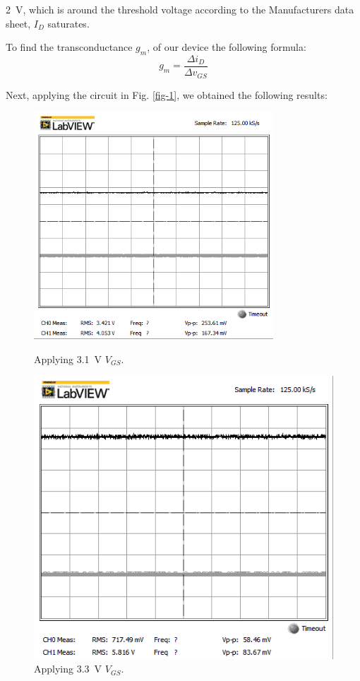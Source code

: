 \documentclass[journal]{IEEEtran}
\begin{document}
\SI{2}{\volt}, which is around the  threshold voltage according to the Manufacturers data sheet,
$I_{D}$ saturates.
\par To find the transconductance $g_{m}$, of our device the following formula:
\begin{equation*}
g_{m}=\frac{\Delta i_{D}}{\Delta v_{GS}}
\end{equation*}
\par Next, applying the circuit in Fig. \ref{fig-1}, we obtained the following results:
\clearpage
\begin{figure}[h]
\end{figure}
\begin{figure}[h]
\centering
\begin{minipage}{.25\textwidth}
  \centering
  \includegraphics[width=0.8\textwidth]{images/1-3dot1vg.png}
  \caption{Applying \SI{3.1}{\volt} $V_{GS}$.}
  \label{fig-vg1}
\end{minipage}%
\begin{minipage}{.25\textwidth}
  \centering
  \includegraphics[width=.8\linewidth]{images/1-3dot3vg.png}
  \caption{Applying \SI{3.3}{\volt} $V_{GS}$.}
  \label{fig-vg2}
\end{minipage}
\end{figure}
\end{document}
